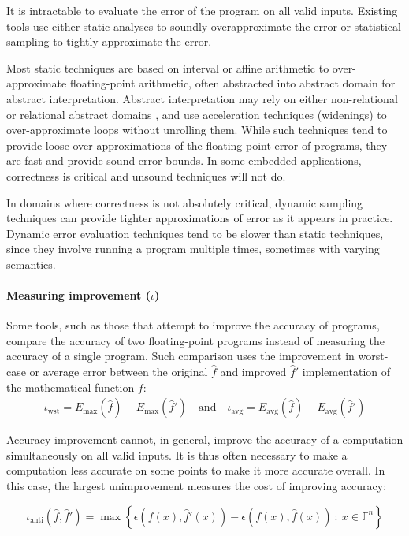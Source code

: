 \documentclass[main.tex]{subfiles}
\begin{document}
It is intractable to evaluate the error of the program on all valid inputs.
Existing tools use
  either static analyses to soundly overapproximate the error
  or statistical sampling to tightly approximate the error.

Most static techniques are based on interval or affine arithmetic
  to over-approximate floating-point arithmetic,
  often abstracted into abstract domain for abstract interpretation.
Abstract interpretation may rely on either non-relational \cite{}
  or relational abstract domains \cite{},
  and use acceleration techniques (widenings)
  to over-approximate loops without unrolling them.
While such techniques tend to provide loose over-approximations
of the floating point error of programs, they are fast and
provide sound error bounds. In some embedded applications,
correctness is critical and unsound techniques will not do.

In domains where correctness is not absolutely critical,
dynamic sampling techniques can provide tighter approximations of
error as it appears in practice. Dynamic error evaluation techniques
tend to be slower than static techniques, since they involve running a
program multiple times, sometimes with varying semantics.

\paragraph{Measuring improvement ($\iota$)}

Some tools,
  such as those that attempt to improve the accuracy of programs,
  compare the accuracy of two floating-point programs
  instead of measuring the accuracy of a single program.
Such comparison uses the improvement in worst-case or average error
  between the original $\hat f$ and improved $\hat f'$ implementation
  of the mathematical function $f$:
\begin{align*}
  \iota_{\text{wst}} = E_{\text{max}}(\hat{f}) - E_{\text{max}}(\hat{f}')
  \quad \text{and} \quad
  \iota_{\text{avg}} = E_{\text{avg}}(\hat{f}) - E_{\text{avg}}(\hat{f}')
\end{align*}

Accuracy improvement cannot, in general,
  improve the accuracy of a computation
  simultaneously on all valid inputs.
It is thus often necessary
  to make a computation less accurate on some points
  to make it more accurate overall.
In this case, the largest unimprovement
  measures the cost of improving accuracy:

\begin{equation*}
  \iota_{\text{anti}}(\hat{f},\hat{f}') = \max \left\{ \epsilon(f(x),\hat{f}'(x)) - \epsilon(f(x),\hat{f}(x))   
\ :\ x\in \mathbb{F}^n\right\}  
\end{equation*}
\end{document}
